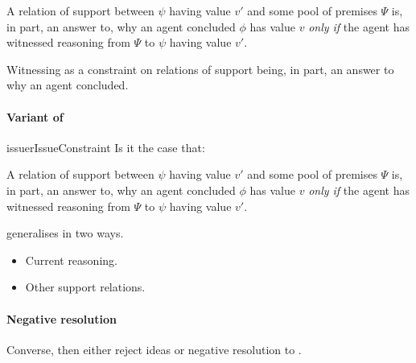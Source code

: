\begin{note}
  \begin{idea}
    A relation of support between \(\psi\) having value \(v'\) and some pool of premises \(\Psi\) is, in part, an answer to, why an agent concluded \(\phi\) has value \(v\) \emph{only if} the agent has witnessed reasoning from \(\Psi\) to \(\psi\) having value \(v'\).
  \end{idea}
\end{note}

\begin{note}
  Witnessing as a constraint on relations of support being, in part, an answer to why an agent concluded.
\end{note}

\paragraph{Variant of \issueInclusion{}}
\label{sec:clar:expand:issue:variant}

\begin{note}
  \begin{restatable}[\issueConstraint{}]{issue}{rIssueConstraint}
    \label{issue:has-witnessed}
    Is it the case that:

    A relation of support between \(\psi\) having value \(v'\) and some pool of premises \(\Psi\) is, in part, an answer to, why an agent concluded \(\phi\) has value \(v\) \emph{only if} the agent has witnessed reasoning from \(\Psi\) to \(\psi\) having value \(v'\).
  \end{restatable}

  {
    \color{red}
    \issueConstraint{} generalises \issueInclusion{} in two ways.
    \begin{itemize}
    \item
      Current reasoning.
    \item
      Other support relations.
    \end{itemize}
  }

\end{note}

\paragraph{Negative resolution}

\begin{note}
  Converse, then either reject ideas or negative resolution to \issueInclusion{}.
\end{note}

